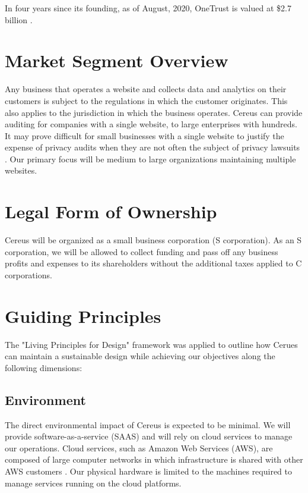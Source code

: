 In four years since its founding, as of August, 2020, OneTrust is valued at \$2.7 billion \cite{hughes.iapp.2020}.

\section{Market Segment Overview}

Any business that operates a website and collects data and analytics on their customers is subject to the regulations in which the customer originates. This also applies to the jurisdiction in which the business operates. Cereus can provide auditing for companies with a single website, to large enterprises with hundreds. It may prove difficult for small businesses with a single website to justify the expense of privacy audits when they are not often the subject of privacy lawsuits \cite{lanou.2020}. Our primary focus will be medium to large organizations maintaining multiple websites. 


\section{Legal Form of Ownership}

Cereus will be organized as a small business corporation (S corporation). As an S corporation, we will be allowed to collect funding and pass off any business profits and expenses to its shareholders without the additional taxes applied to C corporations.

\section{Guiding Principles} \label{guiding.principles}

The "Living Principles for Design" framework \cite{brink.aiga.2020} was applied to outline how Cerues can maintain a sustainable design while achieving our objectives along the following dimensions:

\subsection{Environment}

The direct environmental impact of Cereus is expected to be minimal. We will provide software-as-a-service (SAAS) and will rely on cloud services to manage our operations. Cloud services, such as Amazon Web Services (AWS), are composed of large computer networks in which infrastructure is shared with other AWS customers \cite{aws.2020}. Our physical hardware is limited to the machines required to manage services running on the cloud platforms.

